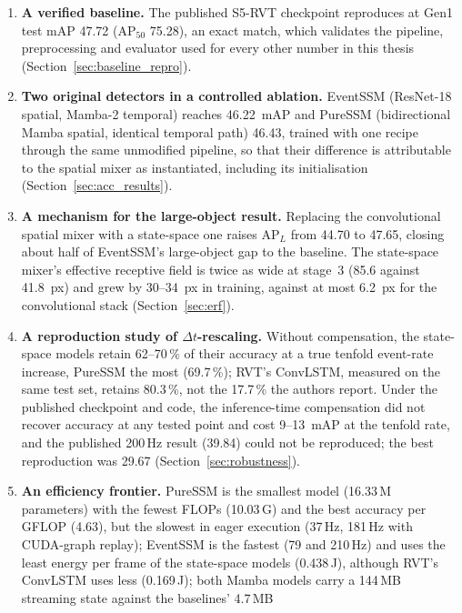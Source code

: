 \documentclass[11pt, a4paper]{report}
\begin{document}
\begin{enumerate}
  \item \textbf{A verified baseline.} The published S5-RVT checkpoint reproduces at Gen1 test mAP 47.72
        ($\mathrm{AP}_{50}$ 75.28), an exact match, which validates the pipeline, preprocessing and
        evaluator used for every other number in this thesis (Section~\ref{sec:baseline_repro}).
  \item \textbf{Two original detectors in a controlled ablation.} EventSSM (ResNet-18 spatial, Mamba-2
        temporal) reaches 46.22~mAP and PureSSM (bidirectional Mamba spatial, identical temporal path)
        46.43, trained with one recipe through the same unmodified pipeline, so that their difference is
        attributable to the spatial mixer as instantiated, including its initialisation
        (Section~\ref{sec:acc_results}).
  \item \textbf{A mechanism for the large-object result.} Replacing the convolutional spatial mixer with
        a state-space one raises $\mathrm{AP}_L$ from 44.70 to 47.65, closing about half of EventSSM's
        large-object gap to the baseline. The state-space mixer's effective receptive field is twice as
        wide at stage~3 (85.6 against 41.8~px) and grew by 30--34~px in training, against at most 6.2~px
        for the convolutional stack (Section~\ref{sec:erf}).
  \item \textbf{A reproduction study of $\Delta t$-rescaling.} Without compensation, the state-space
        models retain 62--70\,\% of their accuracy at a true tenfold event-rate increase, PureSSM the most
        (69.7\,\%); RVT's ConvLSTM, measured on the same test set, retains 80.3\,\%, not the 17.7\,\% the
        authors report. Under
        the published checkpoint and code, the
        inference-time compensation did not recover accuracy at any tested point and cost 9--13~mAP at the
        tenfold rate, and the published 200\,Hz result (39.84) could not be reproduced; the best
        reproduction was 29.67 (Section~\ref{sec:robustness}).
  \item \textbf{An efficiency frontier.} PureSSM is the smallest model (16.33\,M parameters) with the
        fewest FLOPs (10.03\,G) and the best accuracy per GFLOP (4.63), but the slowest in eager execution
        (37\,Hz, 181\,Hz with CUDA-graph replay); EventSSM is the fastest (79 and 210\,Hz) and uses the least
        energy per frame of the state-space models (0.438\,J), although RVT's ConvLSTM uses less (0.169\,J);
        both Mamba models carry a 144\,MB streaming state against the baselines' 4.7\,MB

\end{enumerate}
\end{document}
